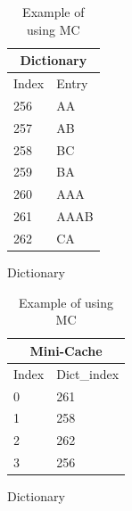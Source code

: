 \begin{table}[]
    \begin{minipage}{.45\textwidth}
        \centering
        \begin{tabular}{|l|l|}
        \hline
        \multicolumn{2}{c}{Dictionary}  \\ \hline
        Index           & Entry         \\ \hline
        256             & AA            \\ 
        257             & AB            \\ 
        258             & BC            \\ 
        259             & BA            \\
        260             & AAA           \\
        261             & AAAB          \\
        262             & CA            \\
        \hline
        \end{tabular}
    \caption{Dictionary}
    \end{minipage}
    \hfill
    \begin{minipage}{.45\textwidth}
        \centering
        \begin{tabular}{|l|l|}
        \hline
        \multicolumn{2}{c}{Mini-Cache}  \\ \hline
        Index        & Dict\_index      \\ \hline
        0            & 261              \\
        1            & 258              \\
        2            & 262              \\
        3            & 256              \\
        \hline
        \end{tabular}
    \caption{Dictionary}
    \end{minipage}
   
    \caption{Example of using MC}
    \label{tab:MC}
\end{table}

